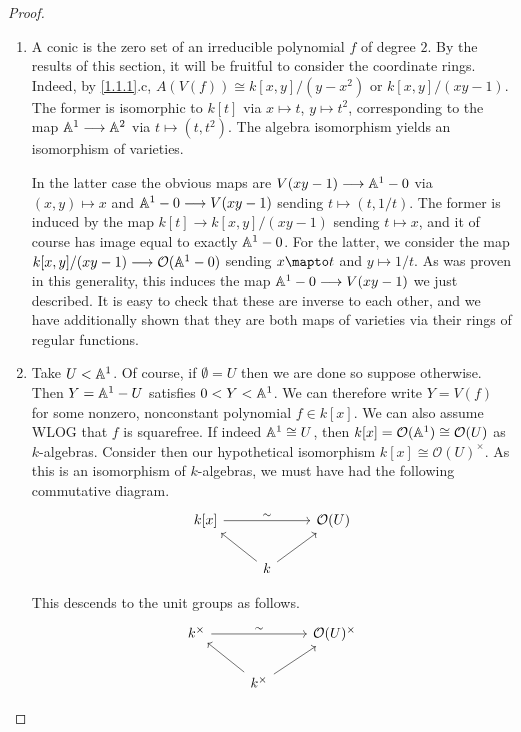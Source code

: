 \begin{proof}
    \begin{enumerate}[label = (\alph*)]
        \item A conic is the zero set of an irreducible polynomial $f$ of degree $2$. By the results of this section, it will be fruitful to consider the coordinate rings. Indeed, by \ref{1.1.1}.c, $A(V(f)) \cong k[x, y]/(y - x^2)$ or $k[x, y]/(xy - 1)$. The former is isomorphic to $k[t]$ via $x \mapsto t$, $y \mapsto t^2$, corresponding to the map $\mathbb A^1 \longrightarrow \mathbb A^2$ via $t \mapsto (t, t^2)$. The algebra isomorphism yields an isomorphism of varieties.

        In the latter case the obvious maps are $V(xy - 1) \longrightarrow \mathbb A^1 - 0$ via $(x, y) \mapsto x$ and $\mathbb A^1 - 0 \longrightarrow V(xy - 1)$ sending $t \mapsto (t, 1/t)$. The former is induced by the map $k[t] \longrightarrow k[x, y]/(xy - 1)$ sending $t \mapsto x$, and it of course has image equal to exactly $\mathbb A^1 - 0$. For the latter, we consider the map $k[x, y]/(xy - 1) \longrightarrow \mathcal O(\mathbb A^1 - 0)$ sending $x \mapto t$ and $y \mapsto 1/t$. As \cite[I.3.5]{hartshorne} was proven in this generality, this induces the map $\mathbb A^1 - 0 \longrightarrow V(xy - 1)$ we just described. It is easy to check that these are inverse to each other, and we have additionally shown that they are both maps of varieties via their rings of regular functions.

        \item Take $U < \mathbb A^1$. Of course, if $\emptyset = U$ then we are done so suppose otherwise. Then $Y = \mathbb A^1 - U$ satisfies $0 < Y < \mathbb A^1$. We can therefore write $Y = V(f)$ for some nonzero, nonconstant polynomial $f \in k[x]$. We can also assume WLOG that $f$ is squarefree. If indeed $\mathbb A^1 \cong U$, then $k[x] = \mathcal O(\mathbb A^1) \cong \mathcal O(U)$ as $k$-algebras. Consider then our hypothetical isomorphism $k[x] \cong \mathcal O(U)^\times$. As this is an isomorphism of $k$-algebras, we must have had the following commutative diagram.
        $$
        \begin{tikzcd}
            k[x] \arrow[rr, "\sim"] && \mathcal O(U)\\
            & k \arrow[ur] \arrow[ul]
        \end{tikzcd}
        $$

        This descends to the unit groups as follows.
        $$
        \begin{tikzcd}
            k^\times \arrow[rr, "\sim"] && \mathcal O(U)^\times\\
            & k^\times \arrow[ur] \arrow[ul]
        \end{tikzcd}
        $$


\end{enumerate}
\end{proof}
